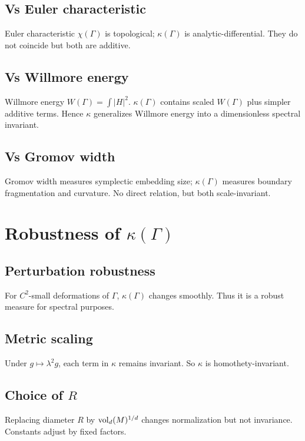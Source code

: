 \subsection{Vs Euler characteristic}
Euler characteristic $\chi(\Gamma)$ is topological; $\kappa(\Gamma)$ is analytic-differential.  
They do not coincide but both are additive.

\subsection{Vs Willmore energy}
Willmore energy $W(\Gamma)=\int |H|^2$.  
$\kappa(\Gamma)$ contains scaled $W(\Gamma)$ plus simpler additive terms.  
Hence $\kappa$ generalizes Willmore energy into a dimensionless spectral invariant.

\subsection{Vs Gromov width}
Gromov width measures symplectic embedding size; $\kappa(\Gamma)$ measures boundary fragmentation and curvature.  
No direct relation, but both scale-invariant.

\section{Robustness of $\kappa(\Gamma)$}
\label{sec:robustness}

\subsection{Perturbation robustness}
For $C^2$-small deformations of $\Gamma$, $\kappa(\Gamma)$ changes smoothly.  
Thus it is a robust measure for spectral purposes.

\subsection{Metric scaling}
Under $g\mapsto \lambda^2 g$, each term in $\kappa$ remains invariant.  
So $\kappa$ is homothety-invariant.

\subsection{Choice of $R$}
Replacing diameter $R$ by $\operatorname{vol}_d(M)^{1/d}$ changes normalization but not invariance.  
Constants adjust by fixed factors.

